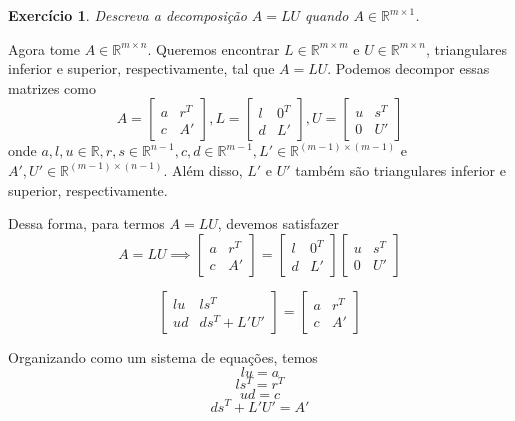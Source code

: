 \documentclass[]{article}
\newtheorem{exercicio}{Exercício}
\numberwithin{equation}{section}
\begin{document}
\begin{exercicio}
	Descreva a decomposição $A = LU$ quando $A \in \mathbb{R}^{m \times 1}$.
\end{exercicio}

Agora tome $A \in \mathbb{R}^{m \times n}$. Queremos encontrar $L \in \mathbb{R}^{m \times m}$ e $U \in \mathbb{R}^{m \times n}$, triangulares inferior e superior, respectivamente, tal que $A = LU$. Podemos decompor essas matrizes como
$$
A =
\begin{bmatrix}
a & r^T \\
c & A'
\end{bmatrix}
, L =
\begin{bmatrix}
l & 0^T \\
d & L'
\end{bmatrix}
, U =
\begin{bmatrix}
u & s^T \\
0 & U'
\end{bmatrix}
$$
onde $a, l, u \in \mathbb{R}, r, s \in \mathbb{R}^{n - 1}, c, d \in \mathbb{R}^{m - 1}, L' \in \mathbb{R}^{(m - 1) \times (m - 1)}$ e $A', U' \in \mathbb{R}^{(m - 1) \times (n - 1)}$. Além disso, $L'$ e $U'$ também são triangulares inferior e superior, respectivamente.

Dessa forma, para termos $A = LU$, devemos satisfazer
$$
A = LU \implies
\begin{bmatrix}
a & r^T \\
c & A'
\end{bmatrix}
=
\begin{bmatrix}
l & 0^T \\
d & L'
\end{bmatrix}
\begin{bmatrix}
u & s^T \\
0 & U'
\end{bmatrix}
$$

$$
\begin{bmatrix}
lu & ls^T \\
ud & ds^T + L'U'
\end{bmatrix}
=
\begin{bmatrix}
a & r^T \\
c & A'
\end{bmatrix}
$$

Organizando como um sistema de equações, temos
$$
lu = a
$$
$$
ls^T = r^T
$$
$$
ud = c
$$
$$
ds^T + L'U' = A'
$$
\end{document}
